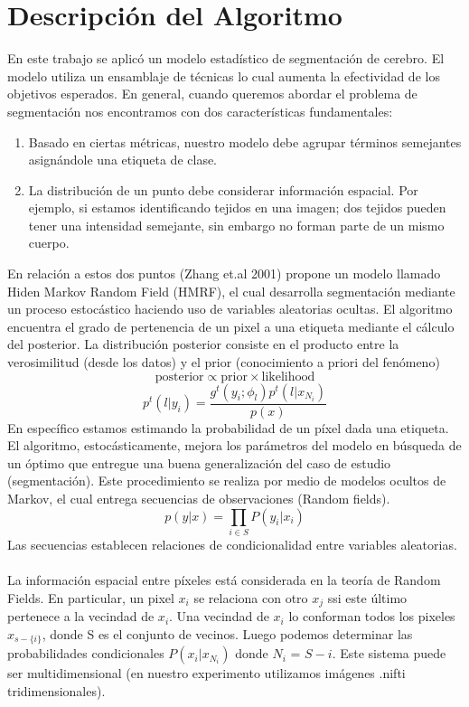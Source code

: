 \documentclass[conference]{IEEEtran}
\begin{document}
\section{Descripción del Algoritmo}
En este trabajo se aplicó un modelo estadístico de segmentación de cerebro. El modelo utiliza un ensamblaje de técnicas lo cual aumenta la efectividad de los objetivos esperados. En general, cuando queremos abordar el problema de segmentación nos encontramos con dos características fundamentales:
\begin{enumerate}
\item Basado en ciertas métricas, nuestro modelo debe agrupar términos semejantes asignándole una etiqueta de clase.
\item La distribución de un punto debe considerar información espacial. Por ejemplo, si estamos identificando tejidos en una imagen; dos tejidos pueden tener una intensidad semejante, sin embargo no forman parte de un mismo cuerpo.
\end{enumerate}
En relación a estos dos puntos (Zhang et.al 2001) propone un modelo llamado Hiden Markov Random Field (HMRF), el cual desarrolla segmentación mediante un proceso estocástico haciendo uso de variables aleatorias ocultas. El algoritmo encuentra el grado de pertenencia de un pixel a una etiqueta mediante el cálculo del posterior. La distribución posterior consiste en el producto entre la verosimilitud (desde los datos) y el prior (conocimiento a priori del fenómeno)
\begin{equation}
\mathrm{posterior} \propto \mathrm{prior} \times \mathrm{likelihood}
\end{equation}
\begin{equation}
p^t(l | y_i) = \frac{g^t(y_i;\phi_l)p^t(l|x_{N_i}) }{p(x)}
\end{equation}
En específico estamos estimando la probabilidad de un píxel dada una etiqueta.  El algoritmo, estocásticamente, mejora los parámetros del modelo en búsqueda de un óptimo que entregue una buena generalización del caso de estudio (segmentación).
Este procedimiento se realiza por medio de modelos ocultos de Markov, el cual entrega secuencias de observaciones (Random fields).
\begin{equation}
p(y|x) = \prod_{i\in S} P(y_i | x_i)
\end{equation}
Las secuencias establecen relaciones de condicionalidad entre variables aleatorias.\\\\La información espacial entre píxeles está considerada en la teoría de Random Fields. En particular, un pixel $x_i$ se relaciona con otro $x_j$ ssi este último pertenece a la vecindad de $x_i$. Una vecindad  de $x_i$ lo conforman todos los pixeles $x_{s-\{i\}}$, donde S es el conjunto de vecinos. Luego podemos determinar las probabilidades condicionales $P(x_i | x_{N_i})$ donde $N_i$ = $S-{i}$. Este sistema puede ser multidimensional (en nuestro experimento utilizamos imágenes .nifti tridimensionales).
\end{document}
